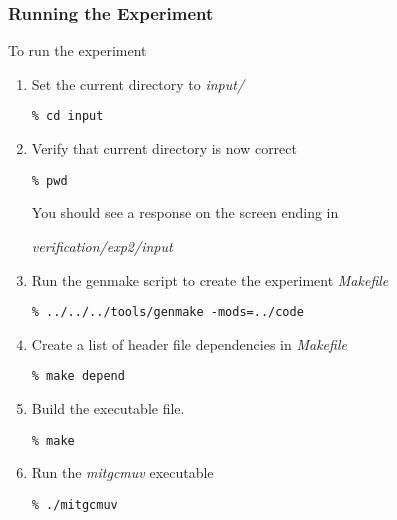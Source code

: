 \subsubsection{Running the Experiment}
\label{www:tutorials}

 To run the experiment

\begin{enumerate}
\item Set the current directory to {\it input/ }

\begin{verbatim}
% cd input
\end{verbatim}

\item Verify that current directory is now correct

\begin{verbatim}
% pwd
\end{verbatim}

 You should see a response on the screen ending in

{\it verification/exp2/input }


\item Run the genmake script to create the experiment {\it Makefile}

\begin{verbatim}
% ../../../tools/genmake -mods=../code
\end{verbatim}

\item Create a list of header file dependencies in {\it Makefile}

\begin{verbatim}
% make depend
\end{verbatim}

\item Build the executable file.

\begin{verbatim}
% make
\end{verbatim}

\item Run the {\it mitgcmuv} executable

\begin{verbatim}
% ./mitgcmuv
\end{verbatim}

\end{enumerate}


